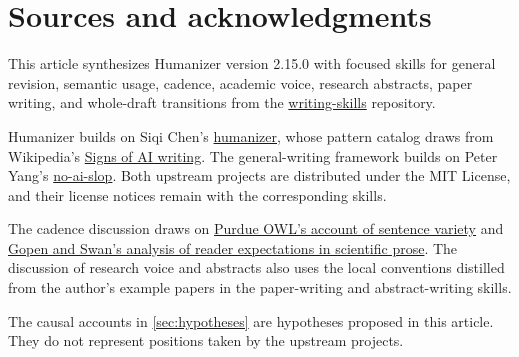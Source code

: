 \section{Sources and acknowledgments}
\label{app:sources}

This article synthesizes Humanizer version 2.15.0 with focused skills for
general revision, semantic usage, cadence, academic voice, research abstracts,
paper writing, and whole-draft transitions from the
\href{https://github.com/msimchowitz/writing-skills}{writing-skills}
repository.

Humanizer builds on Siqi Chen's
\href{https://github.com/blader/humanizer}{humanizer}, whose pattern catalog
draws from Wikipedia's
\href{https://en.wikipedia.org/wiki/Wikipedia:Signs_of_AI_writing}{Signs of AI
writing}. The general-writing framework builds on Peter Yang's
\href{https://github.com/petergyang/no-ai-slop}{no-ai-slop}. Both upstream
projects are distributed under the MIT License, and their license notices
remain with the corresponding skills.

The cadence discussion draws on
\href{https://owl.purdue.edu/owl/general_writing/academic_writing/sentence_variety/index.html}{Purdue
OWL's account of sentence variety} and
\href{https://www.americanscientist.org/blog/the-long-view/the-science-of-scientific-writing}{Gopen
and Swan's analysis of reader expectations in scientific prose}. The
discussion of research voice and abstracts also uses the local conventions
distilled from the author's example papers in the paper-writing and
abstract-writing skills.

The causal accounts in \cref{sec:hypotheses} are hypotheses proposed in this
article. They do not represent positions taken by the upstream projects.
